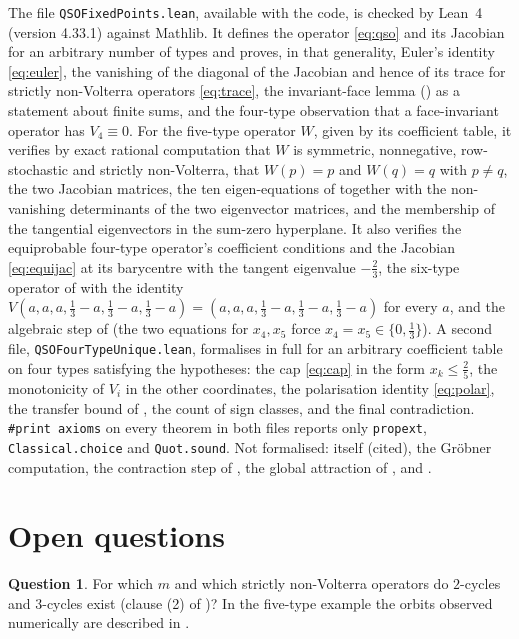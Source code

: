 \documentclass[11pt]{amsart}
\theoremstyle{definition}
\newtheorem{question}[theorem]{Question}
\begin{document}
The file \texttt{QSOFixedPoints.lean}, available with the code, is checked by Lean~4 (version 4.33.1) against Mathlib. It defines the operator \eqref{eq:qso} and its Jacobian for an arbitrary number of types and proves, in that generality, Euler's identity \eqref{eq:euler}, the vanishing of the diagonal of the Jacobian and hence of its trace for strictly non-Volterra operators \eqref{eq:trace}, the invariant-face lemma () as a statement about finite sums, and the four-type observation that a face-invariant operator has $V_4\equiv0$. For the five-type operator $W$, given by its coefficient table, it verifies by exact rational computation that $W$ is symmetric, nonnegative, row-stochastic and strictly non-Volterra, that $W(p)=p$ and $W(q)=q$ with $p\ne q$, the two Jacobian matrices, the ten eigen-equations of  together with the non-vanishing determinants of the two eigenvector matrices, and the membership of the tangential eigenvectors in the sum-zero hyperplane. It also verifies the equiprobable four-type operator's coefficient conditions and the Jacobian \eqref{eq:equijac} at its barycentre with the tangent eigenvalue $-\frac23$, the six-type operator of  with the identity $V(a,a,a,\frac13-a,\frac13-a,\frac13-a)=(a,a,a,\frac13-a,\frac13-a,\frac13-a)$ for every $a$, and the algebraic step of  (the two equations for $x_4,x_5$ force $x_4=x_5\in\{0,\frac13\}$). A second file, \texttt{QSOFourTypeUnique.lean}, formalises  in full for an arbitrary coefficient table on four types satisfying the hypotheses: the cap \eqref{eq:cap} in the form $x_k\le\frac25$, the monotonicity of $V_i$ in the other coordinates, the polarisation identity \eqref{eq:polar}, the transfer bound of , the count of sign classes, and the final contradiction. \texttt{\#print axioms} on every theorem in both files reports only \texttt{propext}, \texttt{Classical.choice} and \texttt{Quot.sound}. Not formalised:  itself (cited), the Gr\"obner computation, the contraction step of , the global attraction of , and .

\section{Open questions}

\begin{question}
For which $m$ and which strictly non-Volterra operators do $2$-cycles and $3$-cycles exist (clause (2) of )? In the five-type example the orbits observed numerically are described in .
\end{question}
\end{document}
